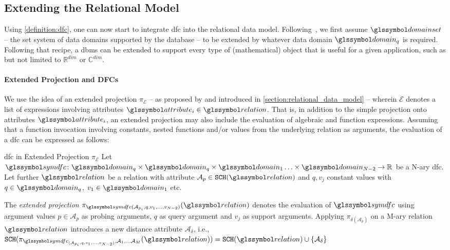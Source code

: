 \subsection{Extending the Relational Model}

Using \cref{definition:dfc}, one can now start to integrate \acrshort{dfc} into the relational data model. Following~\cite{Giangreco:2018thesis}, we first assume  $\domainset$ -- the set system of data domains supported by the database -- to be extended by whatever data domain $\domain_q$ is required. Following that recipe, a \acrshort{dbms} can be extended to support every type of (mathematical) object that is useful for a given application, such as but not limited to $\mathbb{R}^{dim}$ or $\mathbb{C}^{dim}$. 

\paragraph{Extended Projection and DFCs}

We use the idea of an extended projection $\pi_{\mathcal{E}}$ -- as proposed by \cite{Gupta:1995Generalized,Garcia:2009Database} and introduced in \cref{section:relational_data_model} -- wherein $\mathcal{E}$ denotes a list of expressions involving attributes $\attribute_i \in \relation$. That is, in addition to the simple projection onto attributes $\attribute_i$, an extended projection may also include the evaluation of algebraic and function expressions. Assuming that a function invocation involving constants, nested functions and/or values from the underlying relation as arguments, the evaluation of a \acrshort{dfc} can be expressed as follows:

\begin{definition}[label=definition:spf_rel]{\acrlong{dfc} in Extended Projection $\pi_{\mathcal{E}}$}{}
    Let $\symdfc \colon \domain_q \times \domain_q \times \domain_{1} \ldots \times \domain_{N-2} \to \mathbb{R}$ be a N-ary \acrshort{dfc}. Let further $\relation$ be a relation with attribute $\mathcal{A}_p \in \mathtt{SCH}(\relation)$ and $q,v_j$ constant values with $q \in \domain_q$, $v_1 \in \domain_{1}$ etc.
    
    The \emph{extended projection} $\pi_{\symdfc(\mathcal{A}_{p_{i}},q,v_{1},\ldots,v_{N-2})}(\relation)$ denotes the evaluation of $\symdfc$ using argument values $p \in \mathcal{A}_p$ as probing arguments, $q$ as query argument and $v_j$ as support arguments. Applying $\pi_{\delta(\mathcal{A}_p)}$ on a M-ary relation $\relation$ introduces a new distance attribute $\mathcal{A}_\delta$, i.e., $\mathtt{SCH}(\pi_{\symdfc_{(\mathcal{A}_{p_{i}},q,v_{1},\ldots,v_{N-2})}, \mathcal{A}_1, \ldots \mathcal{A}_M}(\relation)) = \mathtt{SCH}(\relation) \cup \{ \mathcal{A}_\delta \}$
\end{definition}

